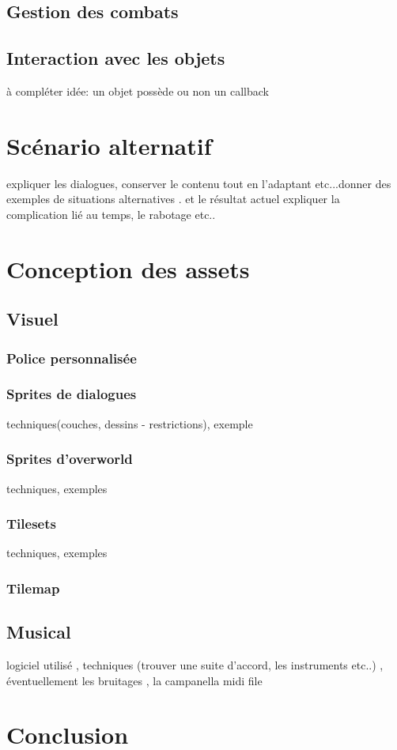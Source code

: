 \documentclass[11pt]{article}
\begin{document}
\subsection{Gestion des combats}
\subsection{Interaction avec les objets}
à compléter idée: un objet possède ou non un callback 


\section{Scénario alternatif}
expliquer les dialogues, conserver le contenu tout en l'adaptant etc...donner des exemples de situations alternatives . et le résultat actuel
expliquer la complication lié au temps, le rabotage etc..
\section{Conception des assets}
\subsection{Visuel}
\subsubsection{Police personnalisée}
\subsubsection{Sprites de dialogues}
techniques(couches, dessins - restrictions), exemple 
\subsubsection{Sprites d'overworld}
techniques, exemples
\subsubsection{Tilesets}
techniques, exemples
\subsubsection{Tilemap}
\subsection{Musical}
logiciel utilisé , techniques (trouver une suite d'accord, les instruments etc..) , éventuellement les bruitages , la campanella midi file
\section{Conclusion}
\end{document}
